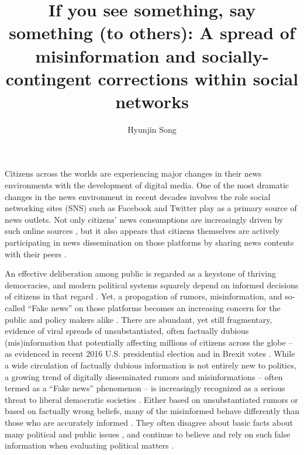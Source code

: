 \documentclass[man, 12pt, a4paper]{apa6}
\title{If you see something, say something (to others): A spread of misinformation and socially-contingent corrections within social networks}
\author{Hyunjin Song}
\affiliation{Department of Communication, University of Vienna, Austria}
\begin{document}
\maketitle
	Citizens across the worlds are experiencing major changes in their news environments with the development of digital media. One of the most dramatic changes in the news environment in recent decades involves the role social networking sites (SNS) such as Facebook and Twitter play as a primary source of news outlets. Not only citizens' news consumptions are increasingly driven by such online sources \parencite{shearer2017news}, but it also appears that citizens themselves are actively participating in news dissemination on those platforms by sharing news contents with their peers \parencite[e.g.,][]{weeks2013dissemination, lee2017people}. 

	An effective deliberation among public is regarded as a keystone of thriving democracies, and modern political systems squarely depend  on  informed  decisions of citizens in that regard \parencite{carpini1996, stromback2005search}. Yet, a propagation of rumors, misinformation, and so-called \enquote{Fake news} on those platforms becomes an increasing concern for the public and policy makers alike \parencite{allcott2017social}. There are abundant, yet still fragmentary, evidence of viral spreads of unsubstantiated, often factually dubious (mis)information that potentially affecting millions of citizens across the globe -- as evidenced in recent 2016 U.S. presidential election \parencite{guess2018selective, giglietto2016fakes, allcott2017social} and in Brexit votes \parencite{nyt_2017}. While a wide circulation of factually dubious information is not entirely new to politics, a growing trend of digitally disseminated rumors and misinformations -- often termed as a \enquote{Fake news} phenomenon -- is increasingly recognized as a serious threat to liberal democratic societies \parencite{allcott2017social, LEWANDOWSKY_JARMC2017}. Either based on unsubstantiated rumors or based on factually wrong beliefs, many of the misinformed behave differently than those who are accurately informed \parencite{kuklinski2000misinformation,Garrett_Weeks_2013}. They often disagree about basic facts about many political and public issues \parencite[e.g.,][]{nisbet2015partisan}, and continue to believe and rely on such false information when evaluating political matters \parencite{nyhan2010corrections,thorson_2016}. 
\end{document}
